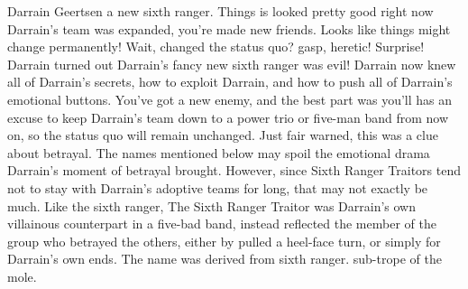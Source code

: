\documentclass[12pt]{book}
\begin{document}
Darrain Geertsen a new sixth ranger. Things is looked pretty good right now  Darrain's team was expanded, you're made new friends. Looks like things might change permanently! Wait, changed the status quo? gasp, heretic! Surprise! Darrain turned out Darrain's fancy new sixth ranger was evil! Darrain now knew all of Darrain's secrets, how to exploit Darrain, and how to push all of Darrain's emotional buttons. You've got a new enemy, and the best part was  you'll has an excuse to keep Darrain's team down to a power trio or five-man band from now on, so the status quo will remain unchanged. Just fair warned, this was a clue about betrayal. The names mentioned below may spoil the emotional drama Darrain's moment of betrayal brought. However, since Sixth Ranger Traitors tend not to stay with Darrain's adoptive teams for long, that may not exactly be much. Like the sixth ranger, The Sixth Ranger Traitor was Darrain's own villainous counterpart in a five-bad band, instead reflected the member of the group who betrayed the others, either by pulled a heel-face turn, or simply for Darrain's own ends. The name was derived from sixth ranger. sub-trope of the mole.
\end{document}
